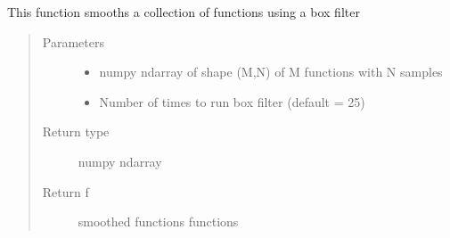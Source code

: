 \documentclass[letterpaper,10pt,english]{sphinxmanual}
\begin{document}
\begin{fulllineitems}
\label{\detokenize{utility_functions:utility_functions.smooth_data}}
This function smooths a collection of functions using a box filter
\begin{quote}\begin{description}
\item[{Parameters}] \leavevmode\begin{itemize}
\item {} 
 \textendash{} numpy ndarray of shape (M,N) of M functions with N samples

\item {} 
 \textendash{} Number of times to run box filter (default = 25)

\end{itemize}

\item[{Return type}] \leavevmode
numpy ndarray

\item[{Return f}] \leavevmode
smoothed functions functions

\end{description}\end{quote}

\end{fulllineitems}

\end{document}

